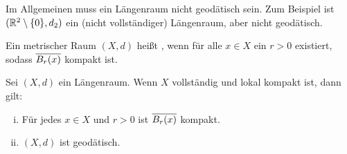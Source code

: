 Im Allgemeinen muss ein Längenraum nicht geodätisch sein.
Zum Beispiel ist $(\mathbb{R}^2 \setminus \{0\}, d_2)$ ein (nicht vollständiger) Längenraum, aber nicht geodätisch.

\begin{definition}
\label{def:2.12}
	Ein metrischer Raum $(X,d)$ heißt , wenn für alle $x \in X$ ein $r > 0$ existiert, sodass $\overline{B_r(x)}$ kompakt ist.
\end{definition}

\begin{theorem}
\label{thm:2.13}
\label{hopf-rinow}
	Sei $(X,d)$ ein Längenraum.
	Wenn $X$ vollständig und lokal kompakt ist, dann gilt: 
	\begin{enumerate}[(i)]
		\item Für jedes $x \in X$ und $r > 0$ ist $\overline{B_r(x)}$ kompakt.
		\item $(X,d)$ ist geodätisch.
	\end{enumerate}
\end{theorem}

